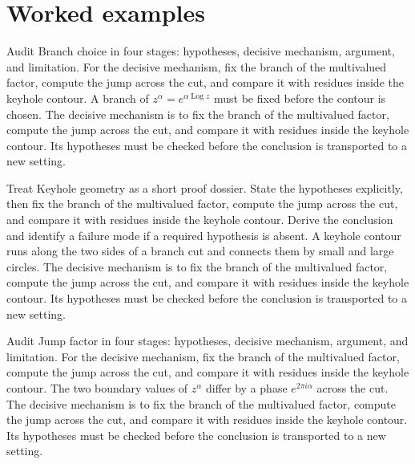 \section{Worked examples}

\begin{example}\label{ex:iv21-worked-01}
Audit Branch choice in four stages: hypotheses, decisive mechanism, argument, and limitation. For the decisive mechanism, fix the branch of the multivalued factor, compute the jump across the cut, and compare it with residues inside the keyhole contour. A branch of $z^\alpha=e^{\alpha\operatorname{Log} z}$ must be fixed before the contour is chosen. The decisive mechanism is to fix the branch of the multivalued factor, compute the jump across the cut, and compare it with residues inside the keyhole contour. Its hypotheses must be checked before the conclusion is transported to a new setting.
\end{example}

\begin{example}\label{ex:iv21-worked-02}
Treat Keyhole geometry as a short proof dossier. State the hypotheses explicitly, then fix the branch of the multivalued factor, compute the jump across the cut, and compare it with residues inside the keyhole contour. Derive the conclusion and identify a failure mode if a required hypothesis is absent. A keyhole contour runs along the two sides of a branch cut and connects them by small and large circles. The decisive mechanism is to fix the branch of the multivalued factor, compute the jump across the cut, and compare it with residues inside the keyhole contour. Its hypotheses must be checked before the conclusion is transported to a new setting.
\end{example}

\begin{example}\label{ex:iv21-worked-03}
Audit Jump factor in four stages: hypotheses, decisive mechanism, argument, and limitation. For the decisive mechanism, fix the branch of the multivalued factor, compute the jump across the cut, and compare it with residues inside the keyhole contour. The two boundary values of $z^\alpha$ differ by a phase $e^{2\pi i\alpha}$ across the cut. The decisive mechanism is to fix the branch of the multivalued factor, compute the jump across the cut, and compare it with residues inside the keyhole contour. Its hypotheses must be checked before the conclusion is transported to a new setting.
\end{example}

